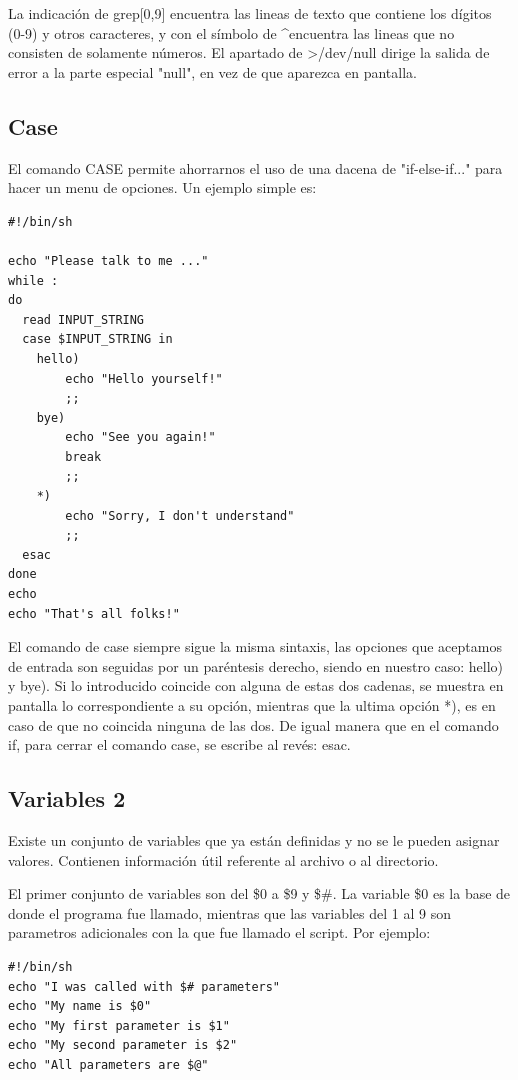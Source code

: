\documentclass[12pt]{article}
\begin{document}
La indicación de grep[0,9] encuentra las lineas de texto que contiene los dígitos (0-9) y otros caracteres, y con el símbolo de \textasciicircum encuentra las lineas que no consisten de solamente números. El apartado de >/dev/null dirige la salida de error a la parte especial "null", en vez de que aparezca en pantalla. 

\subsection{Case}
El comando CASE permite ahorrarnos el uso de una dacena de "if-else-if..." para hacer un menu de opciones. Un ejemplo simple es:

\begin{verbatim}
#!/bin/sh

echo "Please talk to me ..."
while :
do
  read INPUT_STRING
  case $INPUT_STRING in
	hello)
		echo "Hello yourself!"
		;;
	bye)
		echo "See you again!"
		break
		;;
	*)
		echo "Sorry, I don't understand"
		;;
  esac
done
echo 
echo "That's all folks!"
\end{verbatim}

El comando de case siempre sigue la misma sintaxis, las opciones que aceptamos de entrada son seguidas por un paréntesis derecho, siendo en nuestro caso: hello) y bye). Si lo introducido coincide con alguna de estas dos cadenas, se muestra en pantalla lo correspondiente a su opción, mientras que la ultima opción *), es en caso de que no coincida ninguna de las dos. De igual manera que en el comando if, para cerrar el comando case, se escribe al revés: esac.

\subsection{Variables 2}
Existe un conjunto de variables que ya están definidas y no se le pueden asignar valores. Contienen información útil referente al archivo o al directorio. 

El primer conjunto de variables son del \$0 a \$9 y \$\#. La variable \$0 es la base de donde el programa fue llamado, mientras que las variables del 1 al 9 son parametros adicionales con la que fue llamado el script. Por ejemplo:

\begin{verbatim}
#!/bin/sh
echo "I was called with $# parameters"
echo "My name is $0"
echo "My first parameter is $1"
echo "My second parameter is $2"
echo "All parameters are $@"
\end{verbatim}
\end{document}
